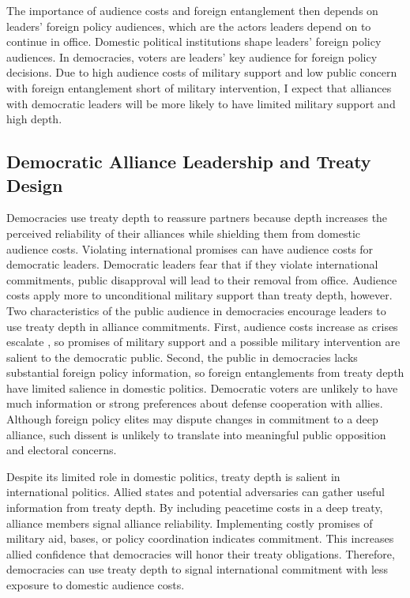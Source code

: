 \documentclass[12pt]{article}
\begin{document}
The importance of audience costs and foreign entanglement then depends on leaders' foreign policy audiences, which are the actors leaders depend on to continue in office.  
Domestic political institutions shape leaders' foreign policy audiences. 
In democracies, voters are leaders' key audience for foreign policy decisions.  
Due to high audience costs of military support and low public concern with foreign entanglement short of military intervention, I expect that alliances with democratic leaders will be more likely to have limited military support and high depth. 



\subsection{Democratic Alliance Leadership and Treaty Design}


Democracies use treaty depth to reassure partners because depth increases the perceived reliability of their alliances while shielding them from domestic audience costs. 
Violating international promises can have audience costs for democratic leaders.
Democratic leaders fear that if they violate international commitments, public disapproval will lead to their removal from office.  
Audience costs apply more to unconditional military support than treaty depth, however. 
Two characteristics of the public audience in democracies encourage leaders to use treaty depth in alliance commitments.  
First, audience costs increase as crises escalate \citep{Tomz2007}, so promises of military support and a possible military intervention are salient to the democratic public.  
Second, the public in democracies lacks substantial foreign policy information, so foreign entanglements from treaty depth have limited salience in domestic politics. 
Democratic voters are unlikely to have much information or strong preferences about defense cooperation with allies. 
Although foreign policy elites may dispute changes in commitment to a deep alliance, such dissent is unlikely to translate 
into meaningful public opposition and electoral concerns.


Despite its limited role in domestic politics, treaty depth is salient in international politics.
Allied states and potential adversaries can gather useful information from treaty depth. 
By including peacetime costs in a deep treaty, alliance members signal alliance reliability. 
Implementing costly promises of military aid, bases, or policy coordination indicates commitment. 
This increases allied confidence that democracies will honor their treaty obligations. 
Therefore, democracies can use treaty depth to signal international commitment with less exposure to domestic audience costs. 
\end{document}
